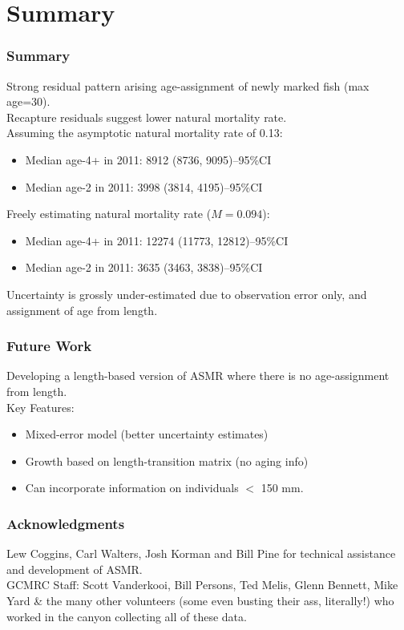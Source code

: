 \documentclass{beamer}
\begin{document}
\section{Summary} %
\label{sec:summary}
\begin{frame}[t]\frametitle{Summary}
	Strong residual pattern arising age-assignment of newly marked fish (max age=30).\\
	\pause \medskip
	Recapture residuals suggest lower natural mortality rate.\\
	\pause \medskip
	Assuming the asymptotic natural mortality rate of 0.13:\\
	\begin{itemize}
		\item     Median age-4+ in 2011: 8912  (8736, 9095)--95\%CI
		\item     Median age-2 in 2011: 3998  (3814, 4195)--95\%CI
	\end{itemize}
	\pause \medskip
	Freely estimating natural mortality rate ($M=0.094$):\\
	\begin{itemize}
		\item     Median age-4+ in 2011: 12274 (11773, 12812)--95\%CI
		\item     Median age-2 in 2011: 3635  (3463, 3838)--95\%CI
	\end{itemize}
	\pause \medskip
	Uncertainty is grossly under-estimated due to observation error only, and assignment of age from length.
\end{frame}
%
\begin{frame}[m]\frametitle{Future Work}
	Developing a length-based version of ASMR where there is no age-assignment from length. \\
	\medskip
	Key Features:
	\begin{itemize}
		\item<1> Mixed-error model (better uncertainty estimates)
		\item<1> Growth based on length-transition matrix (no aging info)
		\item<1> Can incorporate information on individuals $<$ 150 mm.
	\end{itemize}
	
\end{frame}
%
\begin{frame}[t]\frametitle{Acknowledgments}
	\vfill
	Lew Coggins, Carl Walters, Josh Korman and Bill Pine for technical assistance and development of ASMR.\\
	\vfill
	GCMRC Staff: Scott Vanderkooi, Bill Persons, Ted Melis, Glenn Bennett, Mike Yard \& the many other volunteers (some even busting their ass, literally!) who worked in the canyon collecting all of these data.
\end{frame}
\end{document}
